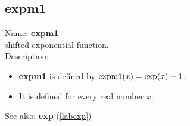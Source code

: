 \subsection{expm1}
\label{labexpm1}
\noindent Name: \textbf{expm1}\\
shifted exponential function.\\
\noindent Description: \begin{itemize}

\item \textbf{expm1} is defined by ${\rm expm1}(x) = \exp(x)-1$.

\item It is defined for every real number $x$.
\end{itemize}
See also: \textbf{exp} (\ref{labexp})
